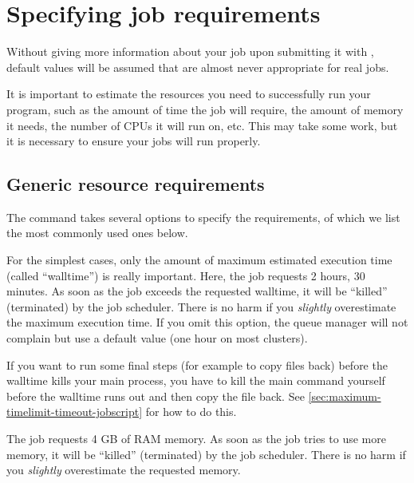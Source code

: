 \fi %

\section{Specifying job requirements}

Without giving more information about your job upon submitting it with
, default values will be assumed that are almost never appropriate
for real jobs.

It is important to estimate the resources you need to successfully run your
program, such as the amount of time the job will require, the amount of memory
it needs, the number of CPUs it will run on, etc. This may take some work, but
it is necessary to ensure your jobs will run properly.

\subsection{Generic resource requirements}
\label{subsec:generic-resource-requirements}

The  command takes several options to specify the requirements, of which we
list the most commonly used ones below. \\

\begin{prompt}
\end{prompt}

For the simplest cases, only the amount of maximum estimated execution time
(called ``walltime'') is really important. Here, the job requests
2 hours, 30 minutes. As soon as the job exceeds the requested walltime,
it will be ``killed'' (terminated) by the job scheduler.  There is no
harm if you \emph{slightly} overestimate the maximum execution time.
If you omit this option, the queue manager will not complain but use a
default value (one hour on most clusters).

If you want to run some final steps (for example to copy files back) before the walltime kills your main process,
you have to kill the main command yourself before the walltime runs out and then copy the
file back. See \autoref{sec:maximum-timelimit-timeout-jobscript} for how to do this.

\begin{prompt}
\end{prompt}

The job requests 4 GB of RAM memory. As soon as the job tries to use more memory,
it will be ``killed'' (terminated) by the job scheduler.  There is no
harm if you \emph{slightly} overestimate the requested memory. \\
 \\

